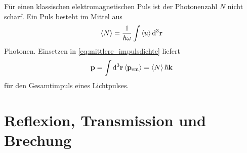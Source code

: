 Für einen klassischen elektromagnetischen Puls ist der Photonenzahl $N$ nicht scharf. Ein Puls besteht im Mittel aus 
\begin{align*}
    \left\langle N\right\rangle = \frac{1}{\hbar\omega} \int \left\langle u\right\rangle \diffa[3]{\vec r}
\end{align*}
Photonen. Einsetzen in \eqref{eq:mittlere_impulsdichte} liefert 
\begin{align*}
    \vec p = \int\diffa[3]{\vec r}\left\langle\vec p_\mathrm{em}\right\rangle = \left\langle N\right\rangle \hbar\vec k
\end{align*}
für den Gesamtimpuls eines Lichtpulses. 




\section{Reflexion, Transmission und Brechung}